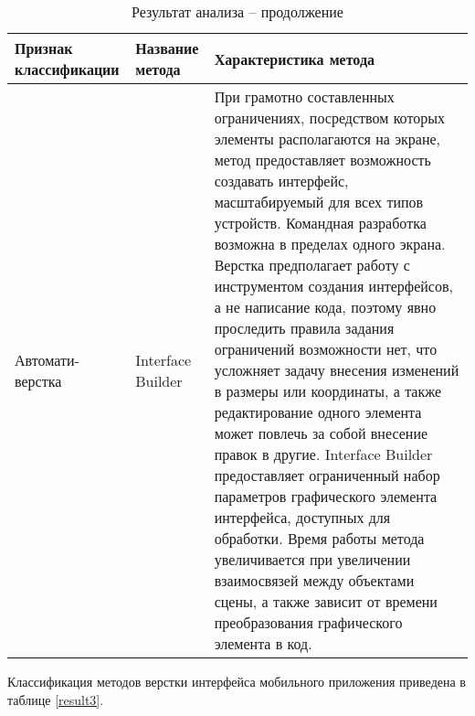 \begin{table}[H]
	\centering
	\caption{Результат анализа -- продолжение}
	\label{result2}
	\begin{tabular}{|p{3.3cm}|p{2.7cm}|p{9.2cm}|}
		\hline
		\textbf{Признак классификации} & \textbf{Название метода} & \textbf{Характеристика метода} \\
		\hline
		\multirow{2}{2.9cm}{Автомати- верстка} & Interface Builder & 
		При грамотно составленных ограничениях, посредством которых элементы располагаются на экране, метод предоставляет 
		возможность создавать интерфейс, масштабируемый для всех типов устройств. 
		Командная разработка возможна в пределах одного экрана. Верстка предполагает работу с инструментом создания интерфейсов, а не написание кода, поэтому явно проследить 
		правила задания ограничений возможности нет, что усложняет задачу внесения изменений в размеры или координаты, 
		а также редактирование одного элемента может повлечь за собой внесение правок в другие. 
		Interface Builder предоставляет ограниченный набор параметров графического элемента интерфейса, доступных для обработки. 
		Время работы метода увеличивается при увеличении взаимосвязей между объектами сцены, а также зависит от времени преобразования графического элемента в код.\\
		\hline
	\end{tabular}
\end{table}

Классификация методов верстки интерфейса мобильного приложения приведена в таблице \ref{result3}.



